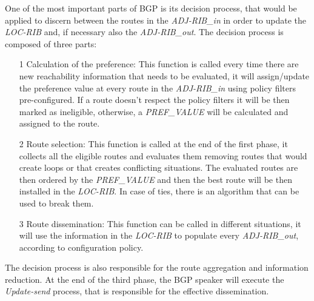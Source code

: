 One of the most important parts of \ac{BGP} is its decision process, that would
be applied to discern between the routes in the \textit{ADJ-RIB\_in} in order
to update the \textit{LOC-RIB} and, if necessary also the \textit{ADJ-RIB\_out}.
The decision process is composed of three parts:
\begin{itemize}
	\item[1] Calculation of the preference: This function is called every time
		there are new reachability information that needs to be evaluated, it 
		will assign/update the preference value at every route in the 
		\textit{ADJ-RIB\_in} using policy filters pre-configured. If a route
		doesn't respect the policy filters it will be then marked as ineligible,
		otherwise, a \textit{PREF\_VALUE} will be calculated and assigned to the
		route.
	\item[2] Route selection: This function is called at the end of the first
		phase, it collects all the eligible routes and evaluates them removing
		routes that would create loops or that creates conflicting situations.
		The evaluated routes are then ordered by the \textit{PREF\_VALUE} and
		then the best route will be then installed in the \textit{LOC-RIB}.
		In case of ties, there is an algorithm that can be used to break them.
	\item[3] Route dissemination: This function can be called in different
		situations, it will use the information in the \textit{LOC-RIB} to
		populate every \textit{ADJ-RIB\_out}, according to configuration
		policy.
\end{itemize}
The decision process is also responsible for the route aggregation and information
reduction.
At the end of the third phase, the \ac{BGP} speaker will execute the
\textit{Update-send} process, that is responsible for the effective dissemination.

